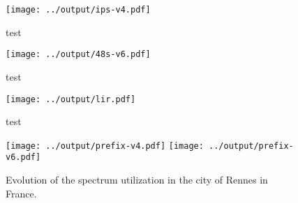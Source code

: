 \documentclass[a4paper,titlepage]{article}
\begin{document}
\begin{figure}
    \centering
    \texttt{[image: ../output/ips-v4.pdf]}
    \caption{test}
\end{figure}

\begin{figure}
    \centering
    \texttt{[image: ../output/48s-v6.pdf]}
    \caption{test}
\end{figure}

\begin{figure}
    \centering
    \texttt{[image: ../output/lir.pdf]}
    \caption{test}
\end{figure}

\begin{figure}
    \centering
    {\texttt{[image: ../output/prefix-v4.pdf]}}
    {\texttt{[image: ../output/prefix-v6.pdf]}}
    \caption{Evolution of the spectrum utilization in the city of Rennes in France.
    \label{fig:perc-antenna-evo}
    }
\end{figure}
\end{document}
